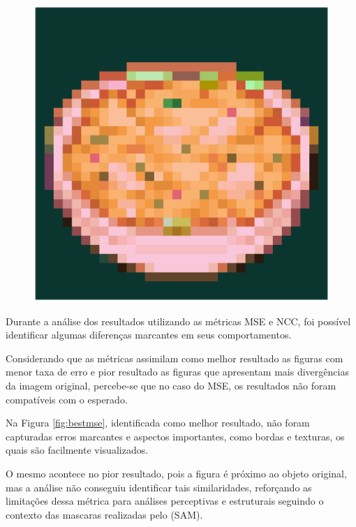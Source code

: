 \begin{figure}[h!]
\begin{minipage}[b]{0.25\textwidth}
    \end{minipage}
    \hfill 
    \begin{minipage}[b]{0.25\textwidth}
        \includegraphics[width=\textwidth]{imagens/41_eggsalad_bowl.result.png}
    \end{minipage}
\end{figure}

Durante a análise dos resultados utilizando as métricas MSE e NCC, foi possível identificar algumas diferenças marcantes em seus comportamentos.

Considerando que as métricas assimilam como melhor resultado as figuras com menor taxa de erro e pior resultado as figuras que apresentam mais divergências da imagem original, percebe-se que no caso do MSE, os resultados não foram compatíveis com o esperado.

Na Figura \ref{fig:bestmse}, identificada como melhor resultado, não foram capturadas erros marcantes e aspectos importantes, como bordas e texturas, os quais são facilmente visualizados.

O mesmo acontece no pior resultado, pois a figura é próximo ao objeto original, mas a análise não conseguiu identificar tais similaridades, reforçando as limitações dessa métrica para análises perceptivas e estruturais seguindo o contexto das mascaras realizadas pelo (SAM).

